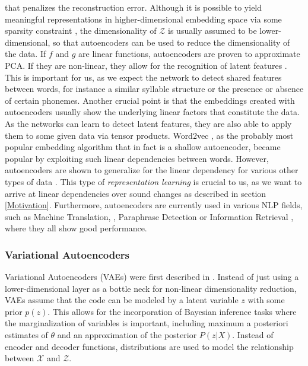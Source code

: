 \documentclass[6pt]{article}
\begin{document}
\noindent that penalizes the reconstruction error. Although it is possible to yield meaningful representations in higher-dimensional embedding space via some sparsity constraint \citep{ng2011sparse}, the dimensionality of $\mathcal{Z}$ is usually assumed to be lower-dimensional, so that autoencoders can be used to reduce the dimensionality of the data. If $f$ and $g$ are linear functions, autoencoders are proven to approximate PCA. If they are non-linear, they allow for the recognition of latent features \citep{hinton2006reducing}. This is important for us, as we expect the network to detect shared features between words, for instance a similar syllable structure or the presence or absence of certain phonemes. Another crucial point is that the embeddings created with autoencoders usually show the underlying linear factors that constitute the data. As the networks can learn to detect latent features, they are also able to apply them to some given data via tensor products. Word2vec \citep{mikolov2013efficient,mikolov2013distributed,goldberg2014word2vec}, as the probably most popular embedding algorithm that in fact is a shallow autoencoder, became popular by exploiting such linear dependencies between words. However, autoencoders are shown to generalize for the linear dependency for various other types of data \citep{radford2015unsupervised,dosovitskiy2015learning}. This type of \textit{representation learning} \citep[p. 526]{Goodfellow-et-al-2016-Book} is crucial to us, as we want to arrive at linear dependencies over sound changes as described in section \ref{Motivation}.  Furthermore, autoencoders are currently used in various NLP fields, such as Machine Translation, \citep{lauly2014autoencoder,zhang2014bilingually}, Paraphrase Detection  \citep{socher2011dynamic} or Information Retrieval \citep{silberer2014learning,le2014distributed}, where they all show good performance. 
\subsubsection{Variational Autoencoders}
\label{Variational Autoencoders}

Variational Autoencoders (VAEs) were first described in \cite{kingma2013auto}. Instead of just using a lower-dimensional layer as a bottle neck for non-linear dimensionality reduction, VAEs assume that the code can be modeled by a latent variable $z$ with some prior $p(z)$. This allows for the incorporation of Bayesian inference tasks where the marginalization of variables is important, including maximum a posteriori estimates of $\theta$ and an approximation of the posterior $P(z|X)$. Instead of encoder and decoder functions, distributions are used to model the relationship between $\mathcal{X} $ and $  \mathcal{Z}$.
\end{document}
